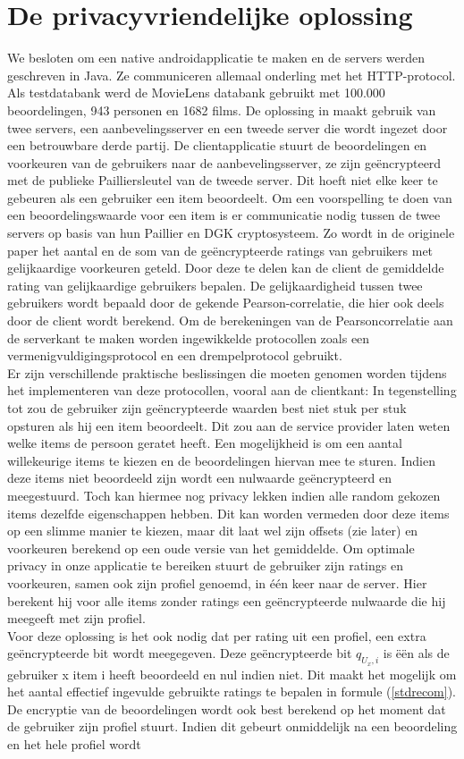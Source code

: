 \documentclass[twocolumn]{phdsymp} %
\begin{document}
\section{De privacyvriendelijke oplossing}
We besloten om een native androidapplicatie te maken en de servers werden geschreven in Java. Ze communiceren allemaal onderling met het HTTP-protocol. Als testdatabank werd de MovieLens databank gebruikt met 100.000 beoordelingen, 943 personen en 1682 films. De oplossing in \cite{dyn} maakt gebruik van twee servers, een aanbevelingsserver en een tweede server die wordt ingezet door een betrouwbare derde partij. De clientapplicatie stuurt de beoordelingen en voorkeuren van de gebruikers naar de aanbevelingsserver, ze zijn ge\"encrypteerd met de publieke Pailliersleutel van de tweede server. Dit hoeft niet elke keer te gebeuren als een gebruiker een item beoordeelt. Om een voorspelling te doen van een beoordelingswaarde voor een item is er communicatie nodig tussen de twee servers op basis van hun Paillier en DGK cryptosysteem. Zo wordt in de originele paper het aantal en de som van de ge\"encrypteerde ratings van gebruikers met gelijkaardige voorkeuren geteld. Door deze te delen kan de client de gemiddelde rating van gelijkaardige gebruikers bepalen. De gelijkaardigheid tussen twee gebruikers wordt bepaald door de gekende Pearson-correlatie, die hier ook deels door de client wordt berekend. Om de berekeningen van de Pearsoncorrelatie aan de serverkant te maken worden ingewikkelde protocollen zoals een vermenigvuldigingsprotocol en een drempelprotocol gebruikt. \\Er zijn verschillende praktische beslissingen die moeten genomen worden tijdens het implementeren van deze protocollen, vooral aan de clientkant: In tegenstelling tot \cite{dyn} zou de gebruiker zijn ge\"encrypteerde waarden best niet stuk per stuk opsturen als hij een item beoordeelt. Dit zou aan de service provider laten weten welke items de persoon geratet heeft. Een mogelijkheid is om een aantal willekeurige items te kiezen en de beoordelingen hiervan mee te sturen. Indien deze items niet beoordeeld zijn wordt een nulwaarde ge\"encrypteerd en meegestuurd. Toch kan hiermee nog privacy lekken indien alle random gekozen items dezelfde eigenschappen hebben. Dit kan worden vermeden door deze items op een slimme manier te kiezen, maar dit laat wel zijn offsets (zie later) en voorkeuren berekend op een oude versie van het gemiddelde. Om optimale privacy in onze applicatie te bereiken stuurt de gebruiker zijn ratings en voorkeuren, samen ook zijn profiel genoemd, in \'e\'en  keer naar de server. Hier berekent hij voor alle items zonder ratings een ge\"encrypteerde nulwaarde die hij meegeeft met zijn profiel.\\ Voor deze oplossing is het ook nodig dat per rating uit een profiel, een extra ge\"encrypteerde bit wordt meegegeven. Deze ge\"encrypteerde bit $ q_{U_x,i} $ is \"e\"en als de gebruiker x item i heeft beoordeeld en nul indien niet. Dit maakt het mogelijk om het aantal effectief ingevulde gebruikte ratings te bepalen in formule (\ref{stdrecom}). De encryptie van de beoordelingen wordt ook best berekend op het moment dat de gebruiker zijn profiel stuurt. Indien dit gebeurt onmiddelijk na een beoordeling en het hele profiel wordt 
\end{document}
